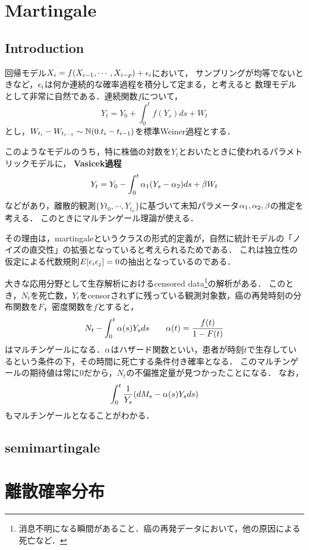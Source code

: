 \documentclass[uplatex,dvipdfmx]{jsreport}
\begin{document}
\chapter{Martingale}

\section{Introduction}

回帰モデル$X_i=f(X_{i-1},\cdots,X_{i-p})+\epsilon_i$において，
サンプリングが均等でないときなど，$\epsilon_i$は何か連続的な確率過程を積分して定まる，と考えると
数理モデルとして非常に自然である．連続関数$f$について，
\[Y_t=Y_0+\int^t_0f(Y_s)ds+W_t\]
とし，$W_{t_i}-W_{t_{i-1}}\sim\mathbb{N}(0.t_i-t_{i-1})$を標準Weiner過程とする．

このようなモデルのうち，特に株価の対数を$Y_t$とおいたときに使われるパラメトリックモデルに，
\textbf{Vasicek過程}
\[Y_t=Y_0-\int^t_0\alpha_1(Y_s-\alpha_2)ds+\beta W_t\]
などがあり，離散的観測$\{Y{t_0},\cdots,Y_{t_n}\}$に基づいて未知パラメータ$\alpha_1,\alpha_2,\beta$の推定を考える．
このときにマルチンゲール理論が使える．

その理由は，martingaleというクラスの形式的定義が，自然に統計モデルの「ノイズの直交性」の拡張となっていると考えられるためである．
これは独立性の仮定による代数規則$E[\epsilon_i\epsilon_j]=0$の抽出となっているのである．

大きな応用分野として生存解析におけるcensored data\footnote{消息不明になる瞬間があること．癌の再発データにおいて，他の原因による死亡など．}の解析がある．
このとき，$N_t$を死亡数，$Y_t$をcensorされずに残っている観測対象数，癌の再発時刻の分布関数を$F$，密度関数を$f$とすると，
\[N_t-\int^t_0\alpha(s)Y_sds\qquad\alpha(t)=\frac{f(t)}{1-F(t)}\]
はマルチンゲールになる．$\alpha$はハザード関数といい，患者が時刻$t$で生存しているという条件の下，その時間に死亡する条件付き確率となる．
このマルチンゲールの期待値は常に$0$だから，$N_t$の不偏推定量が見つかったことになる．
なお，
\[\int^t_0\frac{1}{Y_s}(dM_s-\alpha(s)Y_sds)\]
もマルチンゲールとなることがわかる．

\section{semimartingale}







\chapter{離散確率分布}
\end{document}
